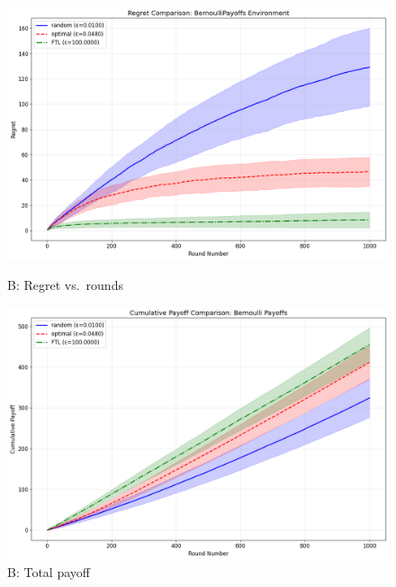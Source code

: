 \documentclass[10pt]{article}
\begin{document}
\begin{figure}[h!]
\centering
\begin{minipage}[t]{0.48\textwidth}
    \centering
    \includegraphics[width=\linewidth]{332Project2/figures/BP_regret.png}
    \caption*{\footnotesize B: Regret vs.\ rounds}
\end{minipage}\hfill
\begin{minipage}[t]{0.48\textwidth}
    \centering
    \includegraphics[width=\linewidth]{BP_payoff.png}
    \caption*{\footnotesize B: Total payoff}
\end{minipage}
\end{figure}
\end{document}

